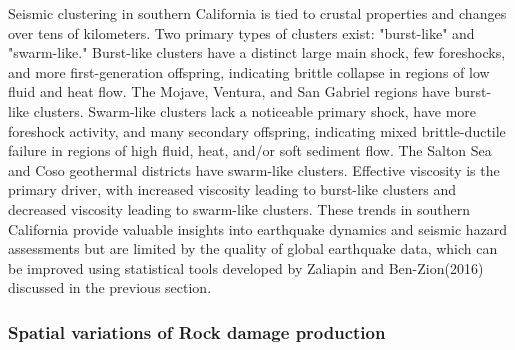 \documentclass[12pt]{article} %
\theoremstyle{plain}
\begin{document}
	
	Seismic clustering in southern California is tied to crustal properties and changes over tens of kilometers. Two primary types of clusters exist: "burst-like" and "swarm-like." Burst-like clusters have a distinct large main shock, few foreshocks, and more first-generation offspring, indicating brittle collapse in regions of low fluid and heat flow. The Mojave, Ventura, and San Gabriel regions have burst-like clusters. Swarm-like clusters lack a noticeable primary shock, have more foreshock activity, and many secondary offspring, indicating mixed brittle-ductile failure in regions of high fluid, heat, and/or soft sediment flow. The Salton Sea and Coso geothermal districts have swarm-like clusters. Effective viscosity is the primary driver, with increased viscosity leading to burst-like clusters and decreased viscosity leading to swarm-like clusters. These trends in southern California provide valuable insights into earthquake dynamics and seismic hazard assessments but are limited by the quality of global earthquake data, which can be improved using statistical tools developed by Zaliapin and Ben-Zion(2016) discussed in the previous section.
	
	
	\subsubsection{Spatial variations of Rock damage production} 
	
\end{document}

